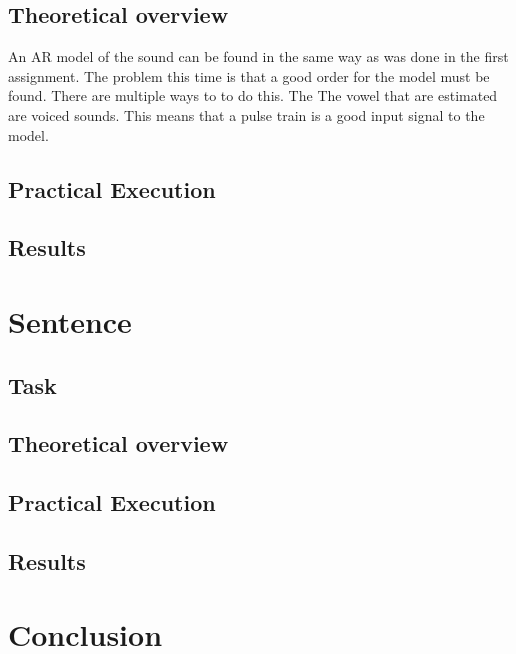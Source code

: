 \documentclass[12pt]{article}
\begin{document}
\subsection{Theoretical overview}
An AR model of the sound can be found in the same way as was done in the first assignment.
The problem this time is that a good order for the model must be found.
There are multiple ways to to do this. The 
The vowel that are estimated are voiced sounds.
This means that a pulse train is a good input signal to the model.

\subsection{Practical Execution}

\subsection{Results}

\section{Sentence}

\subsection{Task}

\subsection{Theoretical overview}

\subsection{Practical Execution}

\subsection{Results}

\section{Conclusion}






\clearpage
{}
%
\end{document}

